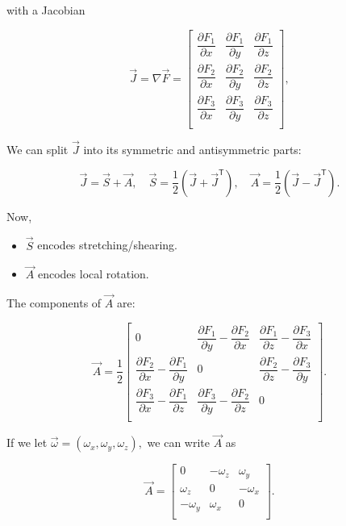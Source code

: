 \documentclass{article}
\begin{document}
with a \@{Jacobian}

\[ \vec{J} = \nabla \vec{F} =  
\begin{bmatrix}
    \dfrac{\partial F_1}{\partial x} & \dfrac{\partial F_1}{\partial y} & \dfrac{\partial F_1}{\partial z}\\
    \dfrac{\partial F_2}{\partial x} & \dfrac{\partial F_2}{\partial y} & \dfrac{\partial F_2}{\partial z}\\
    \dfrac{\partial F_3}{\partial x} & \dfrac{\partial F_3}{\partial y} & \dfrac{\partial F_3}{\partial z}\\
\end{bmatrix}, \]

We can split $\vec{J}$ into its \@{symmetric} and \@{antisymmetric}  parts:

\[ \vec{J} = \vec{S} + \vec{A}, \quad \vec{S} = \frac{1}{2}(\vec{J} + \vec{J}^{\mathsf{T}}), \quad \vec{A} = \frac{1}{2}(\vec{J} - \vec{J}^\mathsf{T}). \]

Now,

\begin{itemize}
\item $\vec{S}$ encodes stretching/shearing.
\end{itemize}

\begin{itemize}
\item $\vec{A}$ encodes local rotation.
\end{itemize}

The \@{components} of $\vec{A}$ are:

\[ \vec{A} = \frac{1}{2}
\begin{bmatrix}
    0 & \dfrac{\partial F_1}{\partial y} - \dfrac{\partial F_2}{\partial x} & \dfrac{\partial F_1}{\partial z} - \dfrac{\partial F_3}{\partial x} \\
    \dfrac{\partial F_2}{\partial x} - \dfrac{\partial F_1}{\partial y}   & 0 & \dfrac{\partial F_2}{\partial z} - \dfrac{\partial F_3}{\partial y} \\
    \dfrac{\partial F_3}{\partial x} - \dfrac{\partial F_1}{\partial z}  & \dfrac{\partial F_3}{\partial y} - \dfrac{\partial F_2}{\partial z}  & 0 \\
\end{bmatrix}. \]

If we let $\vec{\omega} = (\omega_x, \omega_y, \omega_z),$ we can write $\vec{A}$ as

\[ \vec{A} =  
\begin{bmatrix}
    0 & - \omega_z & \omega_y \\
    \omega_z & 0 & - \omega_x \\
    - \omega_y & \omega_x & 0 \\
\end{bmatrix}. \]
\end{document}
